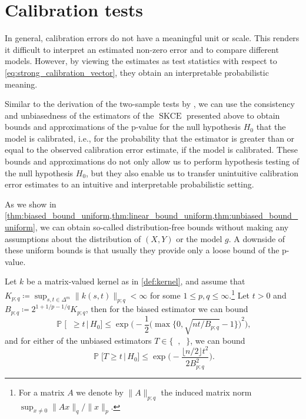 \documentclass{article}
\DeclareMathOperator{\Prob}{\mathbb{P}}
\DeclareMathOperator{\squaredkernelmeasure}{SKCE}
\DeclareMathOperator{\biasedestimator}{\widehat{SKCE}_b}
\DeclareMathOperator{\unbiasedestimator}{\widehat{SKCE}_{uq}}
\DeclareMathOperator{\linearestimator}{\widehat{SKCE}_{ul}}
\newcommand{\nullhypothesis}{H_0}
\begin{document}
\section{Calibration tests}\label{sec:tests}

In general, calibration errors do not have a meaningful unit or scale. This
renders it difficult to interpret an estimated non-zero error and to compare
different models. However, by viewing the estimates as test statistics with
respect to \cref{eq:strong_calibration_vector}, they obtain an interpretable
probabilistic meaning.

Similar to the derivation of the two-sample tests by
\citet{gretton12_kernel_two_sampl_test}, we can use the consistency and
unbiasedness of the estimators of the $\squaredkernelmeasure$ presented above to
obtain bounds and approximations of the p-value for the null hypothesis
$\nullhypothesis$ that the model is calibrated, i.e., for the probability that
the estimator is greater than or equal to the observed calibration error estimate,
if the model is calibrated. These bounds and approximations do not only allow us
to perform hypothesis testing of the null hypothesis $\nullhypothesis$, but they
also enable us to transfer unintuitive calibration error estimates to an
intuitive and interpretable probabilistic setting.

As we show in \cref{thm:biased_bound_uniform,thm:linear_bound_uniform,thm:unbiased_bound_uniform},
we can obtain so-called distribution-free bounds without making any assumptions
about the distribution of $(X,Y)$ or the model $g$. A downside of these uniform
bounds is that usually they provide only a loose bound of the p-value.

\begin{lemma}
  Let $k$ be a matrix-valued kernel as in \cref{def:kernel}, and assume that
  $K_{p;q} \coloneqq \sup_{s,t \in \Delta^m} \|k(s,t)\|_{p;q} < \infty$ for some
  $1 \leq p,q \leq \infty$.\footnote{For a matrix $A$ we denote by
    $\|A\|_{p;q}$ the induced matrix norm
    $\sup_{x \neq 0} \|Ax\|_q / \|x\|_p$.} Let $t > 0$ and
  $B_{p;q} \coloneqq 2^{1 + 1 / p - 1 / q} K_{p;q}$, then for the biased estimator
  we can bound
  \begin{equation*}
    \Prob\Big[\biasedestimator \geq t \,\Big|\, \nullhypothesis \Big] \leq \exp{\bigg(-\frac{1}{2}{\Big(\max\Big\{0, \sqrt{nt / B_{p;q}} - 1 \Big\}\Big)}^2\bigg)},
  \end{equation*}
  and for either of the unbiased estimators
  $T \in \{\unbiasedestimator,\linearestimator\}$, we can bound
  \begin{equation*}
    \Prob\Big[T \geq t \,\Big|\, \nullhypothesis\Big] \leq \exp{\bigg(- \frac{\lfloor n/2 \rfloor t^2}{2 B_{p;q}^2}\bigg)}.
  \end{equation*}
\end{lemma}
\end{document}
